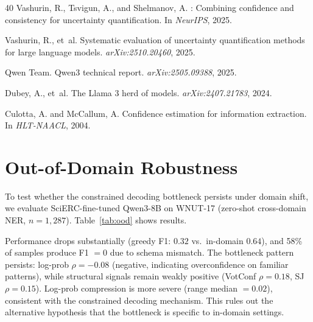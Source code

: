 \documentclass[11pt,a4paper]{article}
\begin{document}
\begin{thebibliography}{40}
Vashurin, R., Tsvigun, A., and Shelmanov, A.
: Combining confidence and consistency for uncertainty quantification.
\newblock In \emph{NeurIPS}, 2025.

Vashurin, R., et~al.
\newblock Systematic evaluation of uncertainty quantification methods for large language models.
\newblock \emph{arXiv:2510.20460}, 2025.

Qwen Team.
\newblock Qwen3 technical report.
\newblock \emph{arXiv:2505.09388}, 2025.

Dubey, A., et~al.
\newblock The {L}lama 3 herd of models.
\newblock \emph{arXiv:2407.21783}, 2024.

Culotta, A. and McCallum, A.
\newblock Confidence estimation for information extraction.
\newblock In \emph{HLT-NAACL}, 2004.

\end{thebibliography}

\appendix
\section{Out-of-Domain Robustness}
\label{app:ood}

To test whether the constrained decoding bottleneck persists under domain shift, we evaluate SciERC-fine-tuned Qwen3-8B on WNUT-17 (zero-shot cross-domain NER, $n = 1{,}287$). Table~\ref{tab:ood} shows results.

Performance drops substantially (greedy F1: $0.32$ vs.\ in-domain $0.64$), and 58\% of samples produce F1 $= 0$ due to schema mismatch. The bottleneck pattern persists: log-prob $\rho = -0.08$ (negative, indicating overconfidence on familiar patterns), while structural signals remain weakly positive (VotConf $\rho = 0.18$, SJ $\rho = 0.15$). Log-prob compression is more severe (range median $= 0.02$), consistent with the constrained decoding mechanism. This rules out the alternative hypothesis that the bottleneck is specific to in-domain settings.
\end{document}
